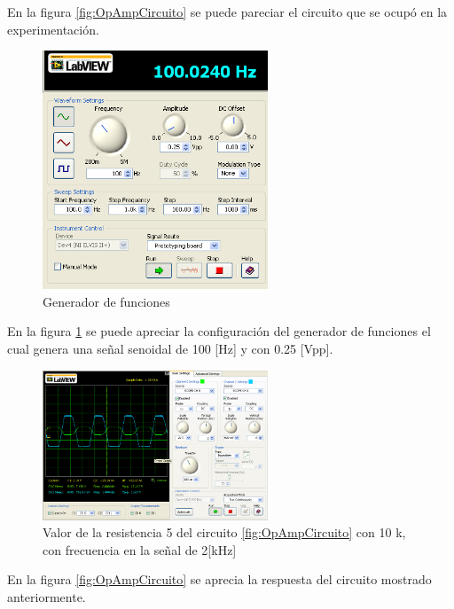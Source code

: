 \documentclass[]{article}
\begin{document}
En la figura \ref{fig:OpAmpCircuito} se puede pareciar el circuito que se ocupó en la experimentación.\\

\begin{figure}[h!]
	\centering
	\includegraphics[width=0.6\textwidth]{Imagenes/fgen250mVpp100Hzdosaplisprac4}
	\caption{Generador de funciones}
	\label{fig:primerCircuito}
\end{figure}

En la figura \ref{fig:primerCircuito} se puede apreciar la configuración del generador de funciones el cual genera una señal senoidal de 100 [Hz] y con 0.25 [Vpp].\\

\begin{figure}[h!]
	\centering
	\includegraphics[width=0.6\textwidth]{Imagenes/r5es10kfrec2Kprac4.png}
	\caption{Valor de la resistencia 5 del circuito \ref{fig:OpAmpCircuito} con 10 k, con frecuencia en la señal de 2[kHz]}
	\label{fig:2K}
\end{figure}

En la figura \ref{fig:OpAmpCircuito} se aprecia la respuesta del circuito mostrado anteriormente.\\
\end{document}
